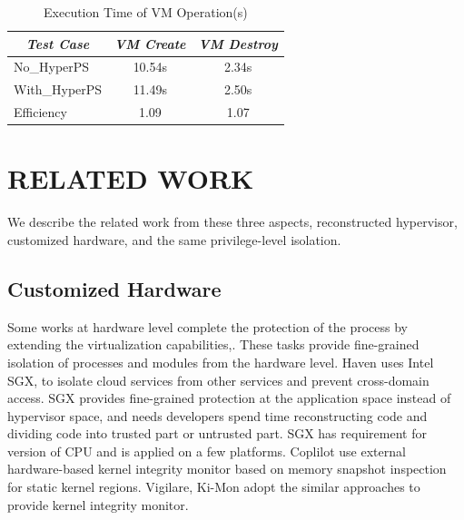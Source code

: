 \documentclass[10pt, numbers, preprint ]{sigplanconf}
\begin{document}
{\begin{table}[htbp]
	\centering
	\caption{Execution Time of VM Operation(s)}
	\label{tb4_exec_tm}
	\begin{tabular}{|l|c|c|}
		\hline
		\multicolumn{1}{|c|}{\textit{\textbf{Test Case}}} & \textit{\textbf{VM Create}} & \multicolumn{1}{l|}{\textit{\textbf{VM Destroy}}} \\ \hline
		No\_HyperPS & 10.54s & 2.34s \\ \hline
		With\_HyperPS & 11.49s & 2.50s \\ \hline
		Efficiency & 1.09 & 1.07 \\ \hline
	\end{tabular}
\end{table}

\section{RELATED WORK} \label{sec:relatwk}
We describe the related work from these three aspects, reconstructed hypervisor, customized hardware, and the same privilege-level isolation.

\subsection{Customized Hardware} \label{subsec:custmhdwr}
Some works at hardware level complete the protection of the process by extending the virtualization capabilities\cite{DBLP:conf/ccs/MoonLLKPK12},\cite{DBLP:journals/tdsc/LeeMHJJKPK19}. These tasks provide fine-grained isolation of processes and modules from the hardware level. Haven\cite{DBLP:journals/tocs/BaumannPH15} uses Intel SGX\cite{DBLP:conf/isca/HoekstraLPPC13},\cite{DBLP:conf/isca/McKeenABRSSS13} to isolate cloud services from other services and prevent cross-domain access. SGX provides fine-grained protection at the application space instead of hypervisor space, and needs developers spend time reconstructing code and dividing code into trusted part or untrusted part. SGX has requirement for version of CPU and is applied on a few platforms. Coplilot \cite{coplilot} use external hardware-based kernel integrity monitor based on memory snapshot inspection for static kernel regions. Vigilare\cite{vigilare}, Ki-Mon\cite{ki-mon} adopt the similar approaches to provide kernel integrity monitor.

}
\end{document}
